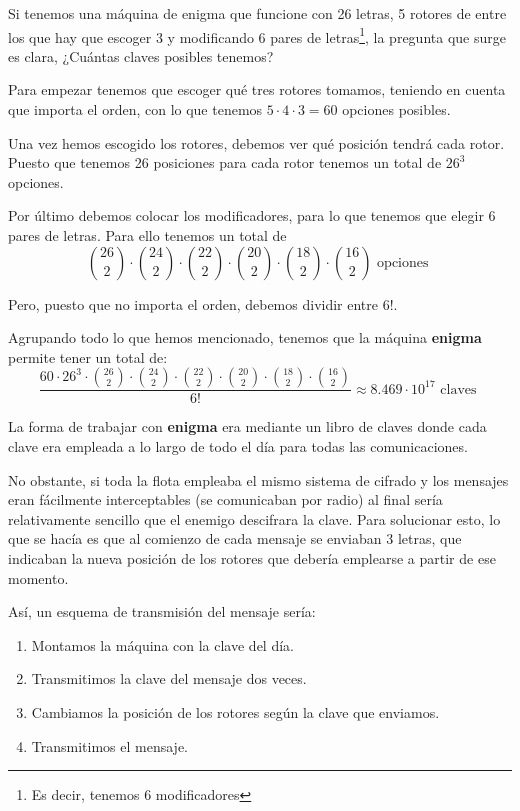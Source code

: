 Si tenemos una máquina de enigma que funcione con 26 letras, 5 rotores de entre los que hay que escoger 3 y modificando 6 pares de letras\footnote{Es decir, tenemos 6 modificadores}, la pregunta que surge es clara, ¿Cuántas claves posibles tenemos?

Para empezar tenemos que escoger qué tres rotores tomamos, teniendo en cuenta que importa el orden, con lo que tenemos $5\cdot 4 \cdot 3 = 60$ opciones posibles.

Una vez hemos escogido los rotores, debemos ver qué posición tendrá cada rotor. Puesto que tenemos 26 posiciones para cada rotor tenemos un total de $26^3$ opciones.

Por último debemos colocar los modificadores, para lo que tenemos que elegir 6 pares de letras. Para ello tenemos un total de
\[{26 \choose 2} \cdot {24\choose 2}\cdot {22\choose 2}\cdot {20\choose 2}\cdot {18\choose 2}\cdot {16\choose 2} \text{ opciones }\]

Pero, puesto que no importa el orden, debemos dividir entre $6!$.

Agrupando todo lo que hemos mencionado, tenemos que la máquina \textbf{enigma} permite tener un total de:
\[\frac{60\cdot 26^3 \cdot {26 \choose 2} \cdot {24\choose 2}\cdot {22\choose 2}\cdot {20\choose 2}\cdot {18\choose 2}\cdot {16\choose 2}}{6!}\approx 8.469 \cdot 10^{17}  \text{ claves }\]

La forma de trabajar con \textbf{enigma} era mediante un libro de claves donde cada clave era empleada a lo largo de todo el día para todas las comunicaciones.

No obstante, si toda la flota empleaba el mismo sistema de cifrado y los mensajes eran fácilmente interceptables (se comunicaban por radio) al final sería relativamente sencillo que el enemigo descifrara la clave. Para solucionar esto, lo que se hacía es que al comienzo de cada mensaje se enviaban 3 letras, que indicaban la nueva posición de los rotores que debería emplearse a partir de ese momento.

Así, un esquema de transmisión del mensaje sería:
\begin{enumerate}
\item Montamos la máquina con la clave del día.
\item Transmitimos la clave del mensaje dos veces.
\item Cambiamos la posición de los rotores según la clave que enviamos.
\item Transmitimos el mensaje.
\end{enumerate}

